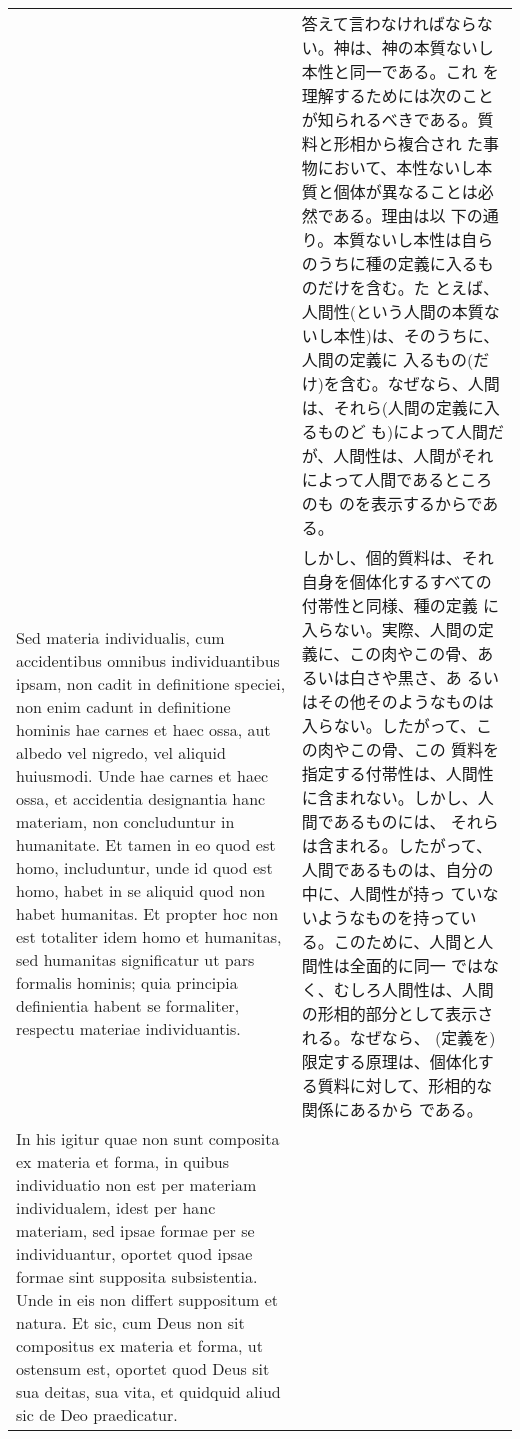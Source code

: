 \documentclass[10pt]{jsarticle}
\begin{document}
\begin{longtable}{p{21em}p{21em}}
&

答えて言わなければならない。神は、神の本質ないし本性と同一である。これ
を理解するためには次のことが知られるべきである。質料と形相から複合され
た事物において、本性ないし本質と個体が異なることは必然である。理由は以
下の通り。本質ないし本性は自らのうちに種の定義に入るものだけを含む。た
とえば、人間性(という人間の本質ないし本性)は、そのうちに、人間の定義に
入るもの(だけ)を含む。なぜなら、人間は、それら(人間の定義に入るものど
も)によって人間だが、人間性は、人間がそれによって人間であるところのも
のを表示するからである。



\\


Sed materia individualis, cum accidentibus omnibus individuantibus
ipsam, non cadit in definitione speciei, non enim cadunt in
definitione hominis hae carnes et haec ossa, aut albedo vel nigredo,
vel aliquid huiusmodi.  Unde hae carnes et haec ossa, et accidentia
designantia hanc materiam, non concluduntur in humanitate.  Et tamen
in eo quod est homo, includuntur, unde id quod est homo, habet in se
aliquid quod non habet humanitas.  Et propter hoc non est totaliter
idem homo et humanitas, sed humanitas significatur ut pars formalis
hominis; quia principia definientia habent se formaliter, respectu
materiae individuantis.

&

しかし、個的質料は、それ自身を個体化するすべての付帯性と同様、種の定義
に入らない。実際、人間の定義に、この肉やこの骨、あるいは白さや黒さ、あ
るいはその他そのようなものは入らない。したがって、この肉やこの骨、この
質料を指定する付帯性は、人間性に含まれない。しかし、人間であるものには、
それらは含まれる。したがって、人間であるものは、自分の中に、人間性が持っ
ていないようなものを持っている。このために、人間と人間性は全面的に同一
ではなく、むしろ人間性は、人間の形相的部分として表示される。なぜなら、
(定義を)限定する原理は、個体化する質料に対して、形相的な関係にあるから
である。


\\


In his igitur quae non sunt composita ex materia et forma, in quibus
individuatio non est per materiam individualem, idest per hanc
materiam, sed ipsae formae per se individuantur, oportet quod ipsae
formae sint supposita subsistentia.  Unde in eis non differt
suppositum et natura.  Et sic, cum Deus non sit compositus ex materia
et forma, ut ostensum est, oportet quod Deus sit sua deitas, sua vita,
et quidquid aliud sic de Deo praedicatur.


\end{longtable}
\end{document}

